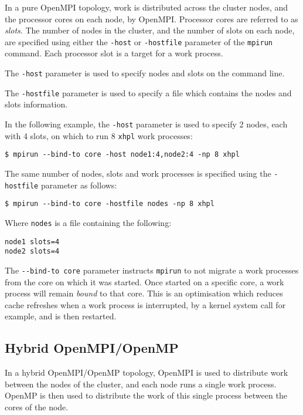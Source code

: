 In a pure OpenMPI topology, work is distributed across the cluster nodes, and the processor cores on each node, by OpenMPI. Processor cores are referred to as \emph{slots}. The number of nodes in the cluster, and the number of slots on each node, are specified using either the \verb|-host| or \verb|-hostfile| parameter of the \verb|mpirun| command. Each processor slot is a target for a work process.

The \verb|-host| parameter is used to specify nodes and slots on the command line.

The \verb|-hostfile| parameter is used to specify a file which contains the nodes and slots information.

In the following example, the \verb|-host| parameter is used to specify 2 nodes, each with 4 slots, on which to run 8 \verb|xhpl| work processes:

\lstset{style=type}
\begin{lstlisting}
$ mpirun --bind-to core -host node1:4,node2:4 -np 8 xhpl
\end{lstlisting}

The same number of nodes, slots and work processes is specified using the \verb|-hostfile| parameter as follows:

\lstset{style=type}
\begin{lstlisting}
$ mpirun --bind-to core -hostfile nodes -np 8 xhpl
\end{lstlisting}

Where \verb|nodes| is a file containing the following:

\lstset{style=listing}
\begin{lstlisting}[numbers=none, caption=nodes]
node1 slots=4
node2 slots=4
\end{lstlisting}

The \verb|--bind-to core| parameter instructs \verb|mpirun| to not migrate a work processes from the core on which it was started. Once started on a specific core, a work process will remain \emph{bound} to that core. This is an optimisation which reduces cache refreshes when a work process is interrupted, by a kernel system call for example, and is then restarted.



%
%
\subsection{Hybrid OpenMPI/OpenMP}
In a hybrid OpenMPI/OpenMP topology, OpenMPI is used to distribute work between the nodes of the cluster, and each node runs a single work process. OpenMP is then used to distribute the work of this single process between the cores of the node.

